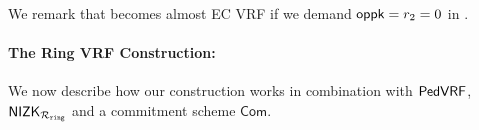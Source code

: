 %



We remark that \PedVRF becomes almost EC VRF if
we demand $\mathsf{oppk} = r_2 = 0$ in \Sign.

\paragraph{The Ring VRF Construction:} We now describe how our construction works in combination with $ {\mathsf{PedVRF}} $, $ {\mathsf{NIZK}}_{\mathcal{R}_{\mathtt{ring}}} $ and a commitment scheme $ \mathsf{Com} $.

